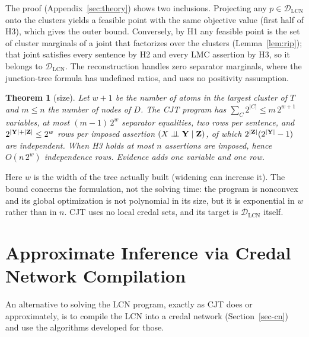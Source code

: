 \documentclass{article} %
\newenvironment{revblock}{\color{blue}}{}
\newtheorem{theorem}{Theorem}
\newcommand{\indep}{\perp\!\!\!\perp}
\newcommand{\DLCN}{\mathcal{D}_{\mathrm{LCN}}}
\begin{document}
\begin{revblock}
The proof (Appendix~\ref{sec:theory}) shows two inclusions. Projecting any
$p\in\DLCN$ onto the clusters yields a feasible point with the same objective
value (first half of H3), which gives the outer bound. Conversely, by H1 any
feasible point is the set of cluster marginals of a joint that factorizes over
the clusters (Lemma~\ref{lem:rip}); that joint satisfies every sentence by H2 and
every LMC assertion by H3, so it belongs to $\DLCN$. The reconstruction handles
zero separator marginals, where the junction-tree formula has undefined ratios,
and uses no positivity assumption.

\begin{theorem}[size]\label{thm:cjt-size}
Let $w+1$ be the number of atoms in the largest cluster of $T$ and $m\le n$ the
number of nodes of $D$. The CJT program has $\sum_{C}2^{|C|}\le m\,2^{w+1}$
variables, at most $(m-1)\,2^{w}$ separator equalities, two rows per sentence,
and $2^{|\mathbf{Y}|+|\mathbf{Z}|}\le 2^{w}$ rows per imposed assertion $(X\indep\bY\mid\bZ)$, of
which $2^{|\mathbf{Z}|}(2^{|\mathbf{Y}|}-1)$ are independent. When H3 holds at most $n$
assertions are imposed, hence $O(n\,2^w)$ independence rows. Evidence adds one
variable and one row.
\end{theorem}

Here $w$ is the width of the tree actually built (widening can increase it). The bound concerns the formulation, not the solving time: the program is nonconvex and its global optimization is not polynomial in its size, but it is exponential in $w$ rather than in $n$. CJT uses no local credal sets, and its target is $\DLCN$ itself.
\end{revblock}

\section{Approximate Inference via Credal Network Compilation}
\label{sec-lcn-to-credal}

An alternative to solving the LCN program, exactly as CJT does or approximately,
is to compile the LCN into a credal network (Section~\ref{sec-cn}) and use the
algorithms developed for those.
\end{document}
